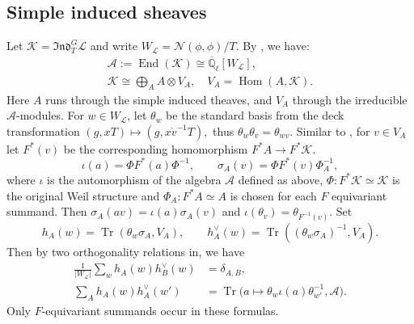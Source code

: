 \documentclass[11pt,letterpaper]{amsart}
\theoremstyle{definition}
\numberwithin{equation}{section}
\numberwithin{theorem}{section}
\begin{document}
\subsection{Simple induced sheaves}
Let $\mathcal K=\mathfrak{Ind}_T^G\mathcal L$ and write
$W_{\mathcal L}=\mathcal{N}(\phi,\phi)/T$.
By
\cite[\S 5]{INY25}, we have:
\begin{equation}\label{isotypic}
\begin{gathered}
 \mathscr A:=\operatorname{End}(\mathcal K)
       \cong\overline{\mathbb Q}_\ell[W_{\mathcal L}],\\
 \mathcal K\cong\bigoplus_A A\otimes V_A,\quad
 V_A=\operatorname{Hom}(A,\mathcal K).
\end{gathered}
\end{equation}
Here $A$ runs through the simple induced theaves, and $V_A$ through the
irreducible $\mathscr A$-modules. For $w\in W_{\mathcal{L}}$, let $\theta_w$ be the standard
basis from the deck transformation
$
(g,xT)\mapsto(g,x\dot v^{-1}T),
$
thus $\theta_w\theta_v=\theta_{wv}$.
Similar to \cite[\S10.4]{Lus_Ch2}, for $v\in V_A$ let $F^*(v)$ be the corresponding homomorphism $F^*A\to F^*\mathcal{K}$.
\[
 \iota(a)=\Phi F^*(a)\Phi^{-1},\qquad
 \sigma_A(v)=\Phi F^*(v)\Phi_A^{-1},
\]
where $\iota$ is the automorphism of the algebra $\mathscr{A}$ defined as above, $\Phi:F^*\mathcal K\simeq\mathcal K$ is the original Weil structure and
$\Phi_A:F^*A\simeq A$ is chosen for each $F$ equivariant summand.
Then $\sigma_A(av)=\iota(a)\sigma_A(v)$ and $\iota(\theta_v)=\theta_{F^{-1}(v)}$. Set
\[
 h_A(w)=\operatorname{Tr}(\theta_w\sigma_A,V_A),\qquad
 h_A^\vee(w)=\operatorname{Tr}((\theta_w\sigma_A)^{-1},V_A).
\]
Then by two orthogonality relations in\cite[\S10.3]{Lus_Ch2}, we have
\begin{equation}\label{twisted-schur}
\begin{aligned}
 \frac1{|W_{\mathcal L}|}\sum_w h_A(w)h_B^\vee(w)&=\delta_{A,B},\\
 \sum_A h_A(w)h_A^\vee(w')
 &=\operatorname{Tr}\bigl(a\mapsto\theta_w\iota(a)\theta_{w'}^{-1},
                         \mathscr A\bigr).
\end{aligned}
\end{equation}
Only $F$-equivariant summands occur in these formulas.
\end{document}

